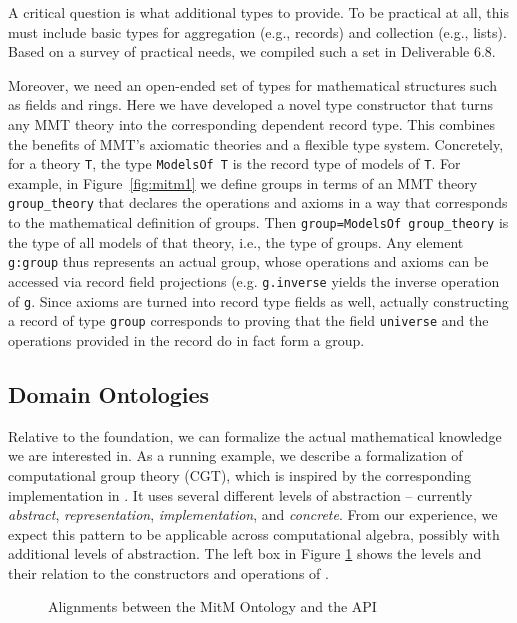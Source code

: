 A critical question is what additional types to provide.
To be practical at all, this must include basic types for aggregation (e.g., records) and collection (e.g., lists).
Based on a survey of practical needs, we compiled such a set in Deliverable 6.8.

Moreover, we need an open-ended set of types for mathematical structures such as fields and rings.
Here we have developed a novel type constructor  that turns any MMT theory into the corresponding dependent record type.
This combines the benefits of MMT's axiomatic theories and a flexible type system.
Concretely, for a theory \lstinline|T|, the type \lstinline|ModelsOf T| is the record type of models of \lstinline|T|.
For example, in Figure~\ref{fig:mitm1} we define groups in terms of an MMT theory \lstinline|group_theory| that declares the operations and axioms in a way that corresponds to the mathematical definition of groups.
Then \lstinline|group=ModelsOf group_theory| is the type of all models of that theory, i.e., the type of groups.
Any element \lstinline|g:group| thus represents an actual group, whose operations and axioms can be accessed via record field projections (e.g. \lstinline|g.inverse| yields the inverse operation of \lstinline|g|.
Since axioms are turned into record type fields as well, actually constructing a record of type \lstinline|group| corresponds to proving that the field \lstinline|universe| and the operations provided in the record do in fact form a group.

\subsection{Domain Ontologies}

Relative to the foundation, we can formalize the actual mathematical knowledge we are interested in.
As a running example, we describe a formalization of computational group theory (CGT), which is inspired by the corresponding implementation in \GAP.
It uses several different levels of abstraction -- currently \emph{abstract}, \emph{representation}, \emph{implementation}, and \emph{concrete}.
From our experience, we expect this pattern to be applicable across computational algebra, possibly with additional levels of abstraction. 
The left box in Figure \ref{fig:cgtontology} shows the levels and their relation to the constructors and operations of \GAP.

\begin{figure}[ht]\centering
  \caption{Alignments between the MitM Ontology and the \GAP API}\label{fig:cgtontology}
\end{figure}

